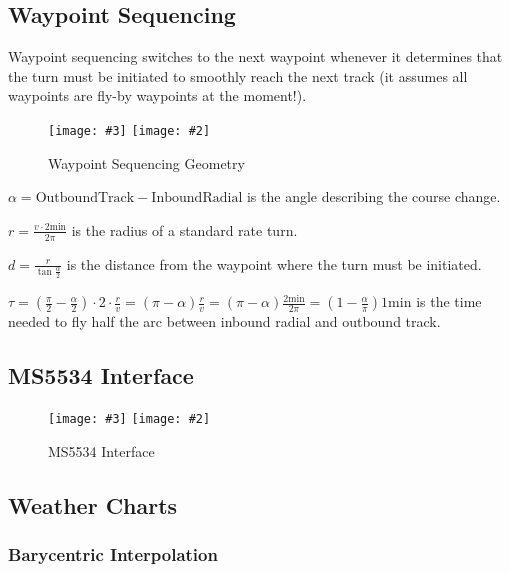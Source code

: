 \documentclass[a4paper,10pt,pdftex]{article}
\newcommand{\jnxfig}[3][]{\ifmypdf\texttt{[image: \#3]}
  \else\texttt{[image: \#2]}\fi}
\begin{document}
\subsection{Waypoint Sequencing}

Waypoint sequencing switches to the next waypoint whenever it
determines that the turn must be initiated to smoothly reach the next
track (it assumes all waypoints are fly-by waypoints at the moment!).

\noindent\begin{figure}[!htbp]
  \begin{center}
    \jnxfig[scale=0.7]{wptseq.eps}{wptseq.pdf}
    \caption{Waypoint Sequencing Geometry}
    \label{fig:wptseq}
  \end{center}
\end{figure}

$\alpha=\mathrm{Outbound Track}-\mathrm{Inbound Radial}$ is the angle
describing the course change.

$r=\frac{v\cdot{}2\mathrm{min}}{2\pi}$ is the radius of a standard
rate turn.

$d=\frac{r}{\tan{\frac{\alpha}{2}}}$ is the distance from the waypoint
where the turn must be initiated.

$\tau=(\frac{\pi}{2}-\frac{\alpha}{2})\cdot{}2\cdot{}\frac{r}{v}=(\pi-\alpha)\frac{r}{v}=(\pi-\alpha)\frac{2\mathrm{min}}{2\pi}=(1-\frac\alpha\pi)1\mathrm{min}$
is the time needed to fly half the arc between inbound radial and outbound track.

\subsection{MS5534 Interface}

\begin{figure}[!htbp]
  \begin{center}
    \jnxfig[angle=0,width=0.8\linewidth]{pbxif.eps}{pbxif.pdf}
    \caption{MS5534 Interface}
    \label{fig:pbxif}
  \end{center}
\end{figure}
\clearpage

\subsection{Weather Charts}

\subsubsection{Barycentric Interpolation}
\end{document}
